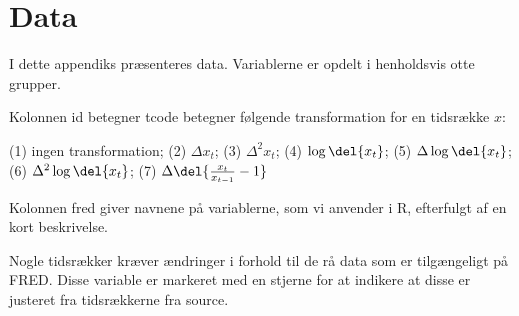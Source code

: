 \chapter{Data}

I dette appendiks præsenteres data. 
Variablerne er opdelt i henholdsvis otte grupper.

Kolonnen id betegner
tcode betegner følgende transformation for en tidsrække $x$:

(1) ingen transformation; (2) \(\Delta x_t\); (3) \(\Delta^2 x_t\); (4) \(\log \del{x_t}\); (5) \(\Delta \log \del{x_t}\); (6) \(\Delta^2 \log \del{x_t}\); (7) \(\Delta \del{\frac{x_t}{x_{t-1}}-1}\)

Kolonnen fred giver navnene på variablerne, som vi anvender i R, efterfulgt af en kort beskrivelse.

Nogle tidsrækker kræver ændringer i forhold til de rå data som er tilgængeligt på FRED.
Disse variable er markeret med en stjerne for at indikere at disse er justeret fra tidsrækkerne fra source.








